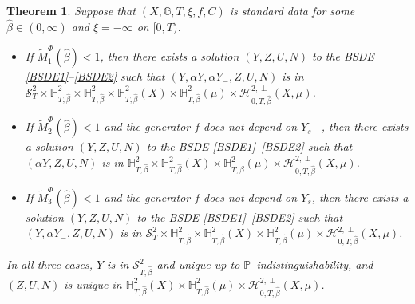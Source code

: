 \documentclass[10pt]{article} %
\newtheorem{theorem}{Theorem}[section]
\newcommand\cH{\mathcal H}
\newcommand\cS{\mathcal S}
\def \G{\mathbb{G}}
\def \H{\mathbb{H}}
\def \P{\mathbb{P}}
\newcommand{\1}{\mathbf{1}}
\begin{document}
\begin{theorem}\label{thm::main_bsde}
	Suppose that $(X,\G,T,\xi,f,C)$ is standard data for some $\hat\beta \in (0,\infty)$ and $\xi = -\infty$ on $[0,T)$.
	
	\begin{itemize}
	\item[$(i)$] If $\widetilde M_1^\Phi(\hat\beta) < 1$, then there exists a solution $(Y,Z,U,N)$ to the {\rm BSDE} \ref{BSDE1}--\ref{BSDE2} such that $(Y,\alpha Y,\alpha Y_-,Z,U,N)$ is in $\cS^2_T \times \H^2_{T,\hat\beta} \times \H^2_{T,\hat\beta} \times \H^2_{T,\hat\beta}(X) \times \H^2_{T,\hat\beta}(\mu) \times \cH^{2,\perp}_{0,T,\hat\beta}(X,\mu)$. %
	
	
	\item[$(ii)$] If $\widetilde M_2^\Phi(\hat\beta) < 1$ and the generator $f$ does not depend on $Y_{s-}$, then there exists a solution $(Y,Z,U,N)$ to the {\rm BSDE} \ref{BSDE1}--\ref{BSDE2} such that $(\alpha Y,Z,U,N)$ is in $\H^2_{T,\hat\beta} \times \H^2_{T,\hat\beta}(X) \times \H^2_{T,\hat\beta}(\mu) \times \cH^{2,\perp}_{0,T,\hat\beta}(X,\mu)$. %


	\item[$(iii)$] If $\widetilde M_3^\Phi(\hat\beta) < 1$ and the generator $f$ does not depend on $Y_s$, then there exists a solution $(Y,Z,U,N)$ to the {\rm BSDE} \ref{BSDE1}--\ref{BSDE2} such that $(Y,\alpha Y_-,Z,U,N)$ is in $\cS^2_T \times \H^2_{T,\hat\beta} \times \H^2_{T,\hat\beta}(X) \times \H^2_{T,\hat\beta}(\mu) \times \cH^{2,\perp}_{0,T,\hat\beta}(X,\mu)$.
	\end{itemize}
	
	In all three cases, $Y$ is in $\cS^2_{T,\hat\beta}$ and unique up to $\P$--indistinguishability, and $(Z,U,N)$ is unique in $\H^2_{T,\hat\beta}(X) \times \H^2_{T,\hat\beta}(\mu) \times \cH^{2,\perp}_{0,T,\hat\beta}(X,\mu)$.
\end{theorem}
\end{document}
